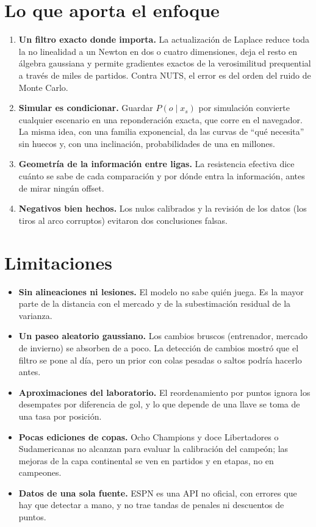 \section{Lo que aporta el enfoque}

\begin{enumerate}
\item \textbf{Un filtro exacto donde importa.} La actualización de Laplace reduce toda la no linealidad a un Newton en dos o cuatro dimensiones, deja el resto en álgebra gaussiana y permite gradientes exactos de la verosimilitud prequential a través de miles de partidos. Contra NUTS, el error es del orden del ruido de Monte Carlo.
\item \textbf{Simular es condicionar.} Guardar $P(o\mid x_s)$ por simulación convierte cualquier escenario en una reponderación exacta, que corre en el navegador. La misma idea, con una familia exponencial, da las curvas de ``qué necesita'' sin huecos y, con una inclinación, probabilidades de una en millones.
\item \textbf{Geometría de la información entre ligas.} La resistencia efectiva dice cuánto se sabe de cada comparación y por dónde entra la información, antes de mirar ningún offset.
\item \textbf{Negativos bien hechos.} Los nulos calibrados y la revisión de los datos (los tiros al arco corruptos) evitaron dos conclusiones falsas.
\end{enumerate}

\section{Limitaciones}

\begin{itemize}
\item \textbf{Sin alineaciones ni lesiones.} El modelo no sabe quién juega. Es la mayor parte de la distancia con el mercado y de la subestimación residual de la varianza.
\item \textbf{Un paseo aleatorio gaussiano.} Los cambios bruscos (entrenador, mercado de invierno) se absorben de a poco. La detección de cambios mostró que el filtro se pone al día, pero un prior con colas pesadas o saltos podría hacerlo antes.
\item \textbf{Aproximaciones del laboratorio.} El reordenamiento por puntos ignora los desempates por diferencia de gol, y lo que depende de una llave se toma de una tasa por posición.
\item \textbf{Pocas ediciones de copas.} Ocho Champions y doce Libertadores o Sudamericanas no alcanzan para evaluar la calibración del campeón; las mejoras de la capa continental se ven en partidos y en etapas, no en campeones.
\item \textbf{Datos de una sola fuente.} ESPN es una API no oficial, con errores que hay que detectar a mano, y no trae tandas de penales ni descuentos de puntos.
\end{itemize}

